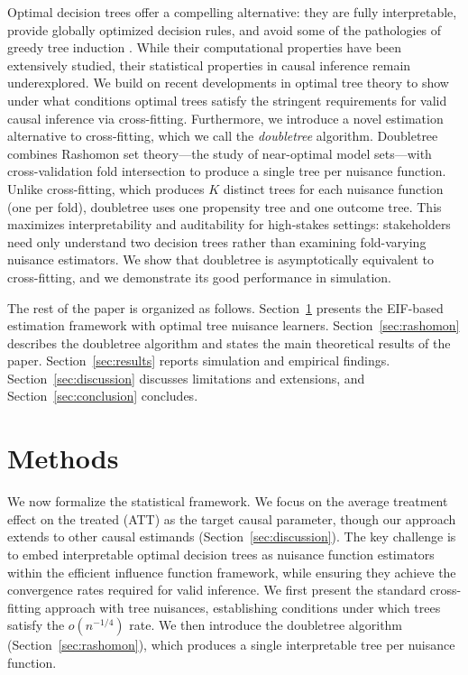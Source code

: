 \documentclass[12pt]{article}
\begin{document}
Optimal decision trees offer a compelling alternative: they are fully interpretable, provide globally optimized decision rules, and avoid some of the pathologies of greedy tree induction \citep{lin2020}. While their computational properties have been extensively studied, their statistical properties in causal inference remain underexplored. We build on recent developments in optimal tree theory to show under what conditions optimal trees satisfy the stringent requirements for valid causal inference via cross-fitting. Furthermore, we introduce a novel estimation alternative to cross-fitting, which we call the \textit{doubletree} algorithm. Doubletree combines Rashomon set theory---the study of near-optimal model sets---with cross-validation fold intersection to produce a single tree per nuisance function. Unlike cross-fitting, which produces $K$ distinct trees for each nuisance function (one per fold), doubletree uses one propensity tree and one outcome tree. This maximizes interpretability and auditability for high-stakes settings: stakeholders need only understand two decision trees rather than examining fold-varying nuisance estimators. We show that doubletree is asymptotically equivalent to cross-fitting, and we demonstrate its good performance in simulation.

The rest of the paper is organized as follows. Section~\ref{sec:methods} presents the EIF-based estimation framework with optimal tree nuisance learners. Section~\ref{sec:rashomon} describes the doubletree algorithm and states the main theoretical results of the paper. Section~\ref{sec:results} reports simulation and empirical findings. Section~\ref{sec:discussion} discusses limitations and extensions, and Section~\ref{sec:conclusion} concludes.

\section{Methods}
\label{sec:methods}

We now formalize the statistical framework. We focus on the average treatment effect on the treated (ATT) as the target causal parameter, though our approach extends to other causal estimands (Section~\ref{sec:discussion}). The key challenge is to embed interpretable optimal decision trees as nuisance function estimators within the efficient influence function framework, while ensuring they achieve the convergence rates required for valid inference. We first present the standard cross-fitting approach with tree nuisances, establishing conditions under which trees satisfy the $o(n^{-1/4})$ rate. We then introduce the doubletree algorithm (Section~\ref{sec:rashomon}), which produces a single interpretable tree per nuisance function.
\end{document}
